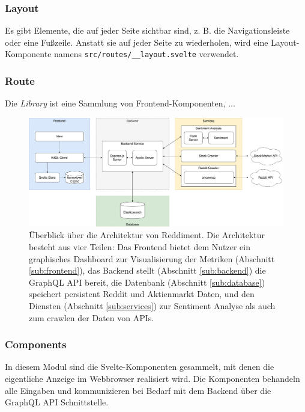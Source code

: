 \documentclass[a4paper, 10pt, conference]{IEEEtran}
\begin{document}
\subsubsection{Layout}

Es gibt Elemente, die auf jeder Seite sichtbar sind, z. B. die Navigationsleiste oder eine Fußzeile. Anstatt sie auf jeder Seite zu wiederholen,  wird eine Layout-Komponente namens \texttt{src/routes/\_\_layout.svelte} verwendet.

\subsubsection{Route}


Die \textit{Library} ist eine Sammlung von Frontend-Komponenten,  ...

\begin{figure}[ht]
	\centering
	\includegraphics[width=\linewidth]{architecture}
	\caption{Überblick über die Architektur von Reddiment. Die Architektur besteht aus vier Teilen: Das Frontend bietet dem Nutzer ein graphisches Dashboard zur Visualisierung der Metriken (Abschnitt \ref{sub:frontend}),  das Backend stellt (Abschnitt \ref{sub:backend}) die GraphQL API bereit,  die Datenbank (Abschnitt \ref{sub:database}) speichert persistent Reddit und Aktienmarkt Daten,  und den Diensten (Abschnitt \ref{sub:services}) zur Sentiment Analyse als auch zum crawlen der Daten von APIs.}
	\label{fig:architecture}
\end{figure}

\subsubsection{Components}

In diesem Modul sind die Svelte-Komponenten gesammelt, mit denen die eigentliche Anzeige im Webbrowser realisiert wird.
Die Komponenten behandeln alle Eingaben und kommunizieren bei Bedarf mit dem Backend über die GraphQL API Schnittstelle.
\end{document}
